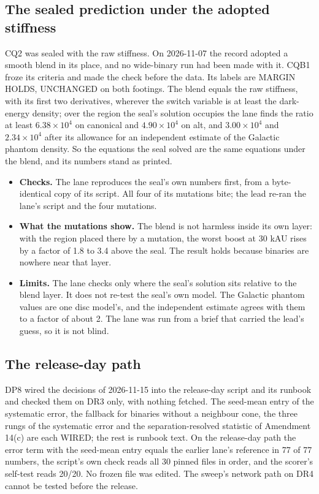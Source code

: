 \documentclass[10pt]{article}
\begin{document}
\subsection{The sealed prediction under the adopted stiffness}
CQ2 was sealed with the raw stiffness. On 2026-11-07 the record adopted a smooth blend in its place, and no wide-binary run had been made with it. CQB1 froze its criteria and made the check before the data. Its labels are MARGIN HOLDS, UNCHANGED on both footings. The blend equals the raw stiffness, with its first two derivatives, wherever the switch variable is at least the dark-energy density; over the region the seal's solution occupies the lane finds the ratio at least $6.38\times10^4$ on canonical and $4.90\times10^4$ on alt, and $3.00\times10^4$ and $2.34\times10^4$ after its allowance for an independent estimate of the Galactic phantom density. So the equations the seal solved are the same equations under the blend, and its numbers stand as printed.
\begin{itemize}
\item \textbf{Checks.} The lane reproduces the seal's own numbers first, from a byte-identical copy of its script. All four of its mutations bite; the lead re-ran the lane's script and the four mutations.
\item \textbf{What the mutations show.} The blend is not harmless inside its own layer: with the region placed there by a mutation, the worst boost at 30 kAU rises by a factor of 1.8 to 3.4 above the seal. The result holds because binaries are nowhere near that layer.
\item \textbf{Limits.} The lane checks only where the seal's solution sits relative to the blend layer. It does not re-test the seal's own model. The Galactic phantom values are one disc model's, and the independent estimate agrees with them to a factor of about 2. The lane was run from a brief that carried the lead's guess, so it is not blind.
\end{itemize}

\subsection{The release-day path}
DP8 wired the decisions of 2026-11-15 into the release-day script and its runbook and checked them on DR3 only, with nothing fetched. The seed-mean entry of the systematic error, the fallback for binaries without a neighbour cone, the three rungs of the systematic error and the separation-resolved statistic of Amendment 14(c) are each WIRED; the rest is runbook text. On the release-day path the error term with the seed-mean entry equals the earlier lane's reference in 77 of 77 numbers, the script's own check reads all 30 pinned files in order, and the scorer's self-test reads 20/20. No frozen file was edited. The sweep's network path on DR4 cannot be tested before the release.
\end{document}
